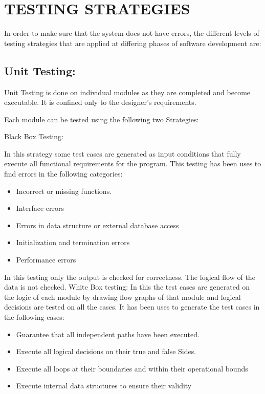 \section {TESTING STRATEGIES}
In order to make sure that the system does not have errors, the different levels of testing strategies that are applied at differing phases of software development are:
\subsection{Unit Testing:}
Unit Testing is done on individual modules as they are completed and become executable. It is confined only to the designer's requirements.

Each module can be tested using the following two Strategies:

Black Box Testing:

In this strategy some test cases are generated as input conditions that fully execute all functional requirements for the program. This testing has been uses to find errors in the following categories:
\begin{itemize}

\item{ Incorrect or missing functions.}

	\item{Interface errors}

	\item{Errors in data structure or external database access}
\item{Initialization and termination errors}
\item{Performance errors}

\end{itemize}
In this testing only the output is checked for correctness. The logical flow of the data is not checked.
White Box testing:
In this the test cases are generated on the logic of each module by drawing flow graphs of that module and logical decisions are tested on all the cases. It has been uses to generate the test cases in the following cases:
\begin{itemize}

\item{Guarantee that all independent paths have been executed.}

	\item{Execute all logical decisions on their true and false Sides.}

	\item{Execute all loops at their boundaries and within their operational bounds}

\item{Execute internal data structures to ensure their validity}

\end{itemize}
